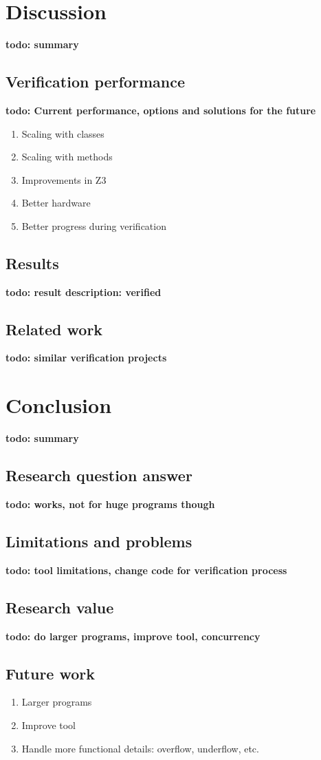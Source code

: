 \documentclass[a4paper]{article}
\newcommand{\todo}[1]{{\color{BurntOrange}\sffamily\textbf{todo: #1}\par}}
\begin{document}
\section{Discussion}
\todo{summary}

\subsection{Verification performance}
\todo{Current performance, options and solutions for the future}
\begin{enumerate}
	\item Scaling with classes
	\item Scaling with methods
	\item Improvements in Z3
	\item Better hardware
	\item Better progress during verification
\end{enumerate}

\subsection{Results}

\todo{result description: verified}

\subsection{Related work}
\todo{similar verification projects}


\section{Conclusion}
\todo{summary}

\subsection{Research question answer}
\todo{works, not for huge programs though}

\subsection{Limitations and problems}
\todo{tool limitations, change code for verification process}

\subsection{Research value}
\todo{do larger programs, improve tool, concurrency}

\subsection{Future work}
\begin{enumerate}
	\item Larger programs
	\item Improve tool
	\item Handle more functional details: overflow, underflow, etc.
\end{enumerate}



\end{document}

